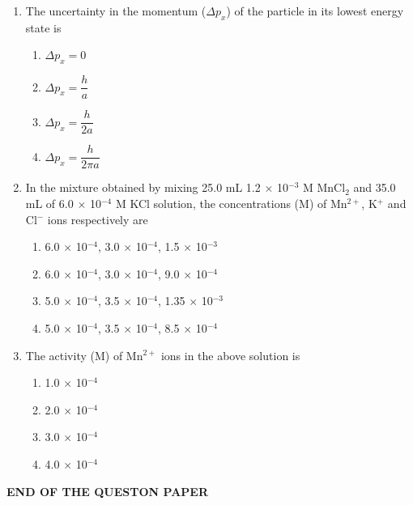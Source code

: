 \documentclass[journal,12pt,onecolumn]{IEEEtran}
\theoremstyle{remark}
\begin{document}
\begin{enumerate}
\item  The uncertainty in the momentum ($\Delta p_x$) of the particle in its lowest energy state is \hfill{}
\begin{multicols}{2}
\begin{enumerate}[label=(\Alph*)]
    \item $\Delta p_x = 0$
    \item $\Delta p_x = \dfrac{h}{a}$
    \item $\Delta p_x = \dfrac{h}{2a}$
    \item $\Delta p_x = \dfrac{h}{2\pi a}$
\end{enumerate}
\end{multicols}



\item  In the mixture obtained by mixing 25.0 mL 1.2 $\times$ 10$^{-3}$ M MnCl$_2$ and 35.0 mL of 6.0 $\times$ 10$^{-4}$ M KCl solution, the concentrations (M) of Mn$^{2+}$, K$^+$ and Cl$^-$ ions respectively are \hfill{}
\begin{multicols}{2}
\begin{enumerate}[label=(\Alph*)]
    \item 6.0 $\times$ 10$^{-4}$, 3.0 $\times$ 10$^{-4}$, 1.5 $\times$ 10$^{-3}$
    \item 6.0 $\times$ 10$^{-4}$, 3.0 $\times$ 10$^{-4}$, 9.0 $\times$ 10$^{-4}$
    \item 5.0 $\times$ 10$^{-4}$, 3.5 $\times$ 10$^{-4}$, 1.35 $\times$ 10$^{-3}$
    \item 5.0 $\times$ 10$^{-4}$, 3.5 $\times$ 10$^{-4}$, 8.5 $\times$ 10$^{-4}$
\end{enumerate}
\end{multicols}

\item  The activity (M) of Mn$^{2+}$ ions in the above solution is \hfill{}
\begin{multicols}{2}
\begin{enumerate}[label=(\Alph*)]
    \item 1.0 $\times$ 10$^{-4}$
    \item 2.0 $\times$ 10$^{-4}$
    \item 3.0 $\times$ 10$^{-4}$
    \item 4.0 $\times$ 10$^{-4}$
\end{enumerate}
\end{multicols}

\end{enumerate}
\begin{center}
    \textbf{END OF THE QUESTON PAPER}
\end{center}
\end{document}
